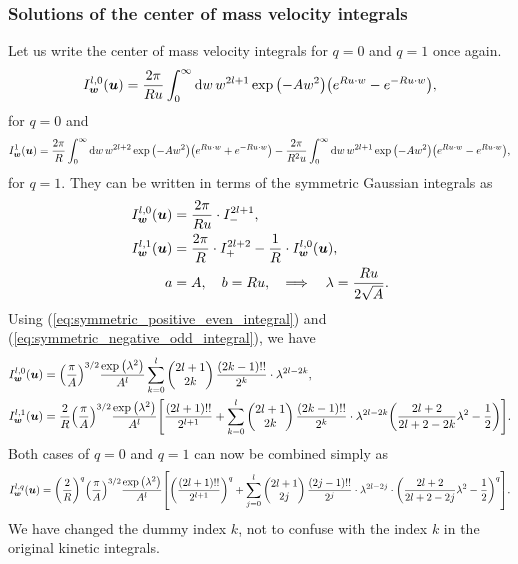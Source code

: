 \documentclass[aps,prl,preprint,groupedaddress,10pt]{revtex4-2}
\begin{document}
\subsubsection{Solutions of the center of mass velocity integrals}
Let us write the center of mass velocity integrals for $q=0$ and $q=1$ once again.
\begin{equation}
    I_{\bw}^{l,0}(\bu)=\frac{2\pi}{Ru}\int_0^{\infty}\dd{w}w^{2l+1}\exp\pqty{-Aw^2}
    \pqty{e^{Ru\cdot w}-e^{-Ru\cdot w}},
\end{equation}
for $q=0$ and
\begin{equation}
    I_{\bw}^{1}(\bu)=\frac{2\pi}{R}\int_0^{\infty}\dd{w}w^{2l+2}\exp\pqty{-Aw^2}
    \pqty{e^{Ru\cdot w}+e^{-Ru\cdot w}}
    -\frac{2\pi}{R^2u}\int_0^{\infty}\dd{w}w^{2l+1}\exp\pqty{-Aw^2}
    \pqty{e^{Ru\cdot w}-e^{Ru\cdot w}},
\end{equation}
for $q=1$. They can be written in terms of the symmetric Gaussian integrals as
\begin{equation}
    \begin{split}
        I_{\vb*{w}}^{l,0}(\vb*{u})&=\frac{2\pi}{Ru}\cdot I^{2l+1}_{-},\\
        I_{\vb*{w}}^{l,1}(\vb*{u})&=\frac{2\pi}{R}\cdot I^{2l+2}_{+}-\frac{1}{R}\cdot I_{\vb*{w}}^{l,0}(\vb*{u}),\\
        a&=A,\quad b=Ru,\quad\Longrightarrow\quad\lambda=\frac{Ru}{2\sqrt{A}}.
    \end{split}
\end{equation}
Using (\ref{eq:symmetric_positive_even_integral}) and (\ref{eq:symmetric_negative_odd_integral}), we have
\begin{equation}
    \begin{split}
        I_{\bw}^{l,0}(\bu)&=\pqty{\frac{\pi}{A}}^{3/2}\frac{\exp\pqty{\lambda^2}}{A^l}
        \sum_{k=0}^{l}\pmqty{2l+1\\2k}\frac{(2k-1)!!}{2^{k}}\cdot\lambda^{2l-2k},\\
        I_{\bw}^{l,1}(\bu)&=\frac{2}{R}\pqty{\frac{\pi}{A}}^{3/2}\frac{\exp\pqty{\lambda^2}}{A^l}
        \bqty{\frac{(2l+1)!!}{2^{l+1}}+\sum_{k=0}^{l}\pmqty{2l+1\\2k}\frac{(2k-1)!!}{2^k}
            \cdot\lambda^{2l-2k}\pqty{\frac{2l+2}{2l+2-2k}\lambda^2-\frac{1}{2}}}.
    \end{split}
\end{equation}
Both cases of $q=0$ and $q=1$ can now be combined simply as
\begin{equation}
    I_{\bw}^{l,q}(\bu)=\pqty{\frac{2}{R}}^q\pqty{\frac{\pi}{A}}^{3/2}\frac{\exp\pqty{\lambda^2}}{A^l}
    \bqty{\pqty{\frac{(2l+1)!!}{2^{l+1}}}^q+\sum_{j=0}^{l}\pmqty{2l+1\\2j}\frac{(2j-1)!!}{2^j}
        \cdot\lambda^{2l-2j}\cdot\pqty{\frac{2l+2}{2l+2-2j}\lambda^2-\frac{1}{2}}^q}.
\end{equation}
We have changed the dummy index $k$, not to confuse with the index $k$ in the original kinetic integrals.
\end{document}
